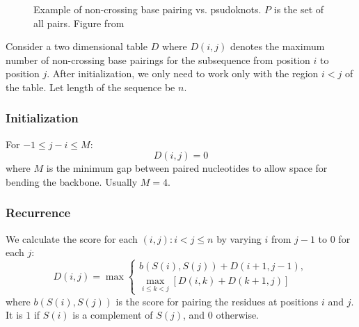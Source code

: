 \documentclass[journal]{IEEEtran}
\begin{document}
\begin{figure}[h]
\centering
{}
\hfil
{}
\caption{Example of non-crossing base pairing vs. psudoknots. $P$ is the set of all pairs. Figure from \cite{MITfigure}}
\label{crossingRNA}
\end{figure}

Consider a two dimensional table $D$ where $D(i,j)$ denotes the maximum number of non-crossing base pairings for the subsequence from position $i$ to position $j$. After initialization, we only need to work only with the region $i<j$ of the table. Let length of the sequence be $n$.

\subsubsection{Initialization}

For $-1 \leq j-i \leq M$:
\[
D(i,j)=0
\] where $M$ is the minimum gap between paired nucleotides to allow space for bending the backbone. Usually $M=4$.

\subsubsection{Recurrence}
We calculate the score for each $(i, j) : i<j\leq n$ by varying $i$ from $j-1$ to $0$ for each $j$:
\begin{equation}\label{recurrence}
D(i,j) = \max \begin{cases} b(S(i),S(j)) + D(i+1,j-1),\\
\max\limits_{i\leq k<j}[D(i,k) + D(k+1, j)]
\end{cases}
\end{equation}
where $b(S(i),S(j))$ is the score for pairing the residues at positions $i$ and $j$. It is $1$ if $S(i)$ is a complement of $S(j)$, and $0$ otherwise.
\end{document}
